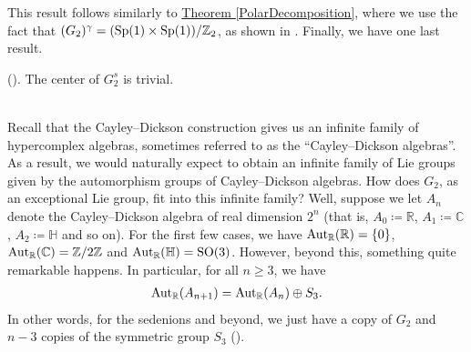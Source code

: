 \noindent This result follows similarly to \hyperref[PolarDecomposition]{Theorem \ref*{PolarDecomposition}}, where we use the fact that $(G_2)^\gamma = (\textup{Sp}(1) \times \textup{Sp}(1))/\mathbb{Z}_2$, as shown in \cite[Theorem 1.10.1]{Yok25}. Finally, we have one last result.\\

\noindent\begin{theorem}\textup{(\cite[Theorem 1.13.2]{Yok25}).} The center of $G_2^s$ is trivial.\\
\end{theorem}

\newpage
\renewcommand\thesection{A}
\noindent\\ Recall that the Cayley--Dickson construction gives us an infinite family of hypercomplex algebras, sometimes referred to as the ``Cayley--Dickson algebras''. As a result, we would naturally expect to obtain an infinite family of Lie groups given by the automorphism groups of Cayley--Dickson algebras. How does $G_2$, as an exceptional Lie group, fit into this infinite family? Well, suppose we let $A_n$ denote the Cayley--Dickson algebra of real dimension $2^n$ (that is, $A_0 \coloneqq \mathbb{R}$, $A_1 \coloneqq \mathbb{C}$, $A_2 \coloneqq \mathbb{H}$ and so on). For the first few cases, we have $\textup{Aut}_\mathbb{R}(\mathbb{R}) = \{0\}$, $\textup{Aut}_\mathbb{R}(\mathbb{C}) = \mathbb{Z}/2\mathbb{Z}$ and $\textup{Aut}_\mathbb{R}(\mathbb{H}) = \textup{SO}(3)$. However, beyond this, something quite remarkable happens. In particular, for all $n \geq 3$, we have
\begin{align*}
\begin{split}
\textup{Aut}_\mathbb{R}(A_{n+1}) = \textup{Aut}_\mathbb{R}(A_n) \oplus S_3.
\end{split}
\end{align*}
\noindent In other words, for the sedenions and beyond, we just have a copy of $G_2$ and $n-3$ copies of the symmetric group $S_3$ (\cite{ES90}).

\newpage
\renewcommand\thesection{R}
\begingroup
\setlength{\emergencystretch}{.5em}
\printbibliography[heading=none]
\endgroup

